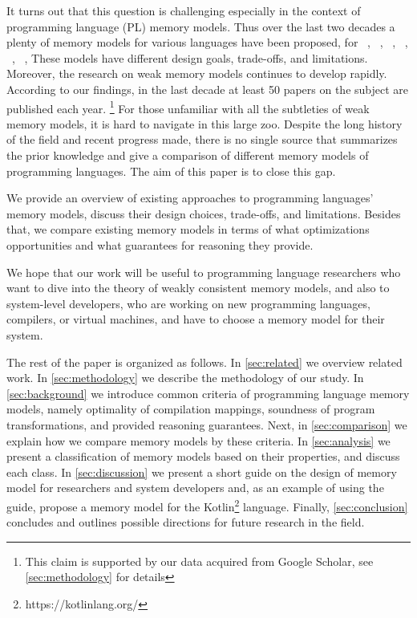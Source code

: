 It turns out that this question is challenging
especially in the context of programming language (PL) memory models.
Thus over the last two decades a plenty of memory models 
for various languages have been proposed, \eg
for \Java~\cite{Manson-al:POPL05, Bender-Palsberg:OOPSLA19}, \CPP~\cite{Batty-al:POPL11}, 
\LLVM~\cite{Chakraborty-Vafeiadis:CGO17}, \JS~\cite{Watt-al:PLDI2020}, 
\OCaml~\cite{Manson-al:POPL05}, \Haskell~\cite{Vollmer-al:PPoPP17}, \etc 
These models have different design goals, trade-offs, and limitations.
Moreover, the research on weak memory models continues to develop rapidly.
According to our findings, 
in the last decade at least 50 papers on the subject are published each year.%
\footnote{This claim is supported by our data acquired from Google Scholar, 
see \cref{sec:methodology} for details}  
For those unfamiliar with all the subtleties 
of weak memory models, it is hard to navigate in this large zoo.
Despite the long history of the field and recent progress made, 
there is no single source that summarizes the prior knowledge
and give a comparison of different memory models of programming languages. 
The aim of this paper is to close this gap.

We provide an overview of existing approaches to 
programming languages' memory models,
discuss their design choices, trade-offs, and limitations.
Besides that, we compare existing memory models 
in terms of what optimizations opportunities 
and what guarantees for reasoning they provide.

We hope that our work will be useful to programming language researchers 
who want to dive into the theory of weakly consistent memory models,
and also to system-level developers, 
who are working on new programming languages, compilers, or virtual machines, 
and have to choose a memory model for their system.

The rest of the paper is organized as follows.
In \cref{sec:related} we overview related work. 
In \cref{sec:methodology} we describe the methodology 
of our study. In \cref{sec:background} we 
introduce common criteria of programming language memory models,
namely optimality of compilation mappings, 
soundness of program transformations, 
and provided reasoning guarantees.
Next, in \cref{sec:comparison} we explain 
how we compare memory models by these criteria.
In \cref{sec:analysis} we present a classification
of memory models based on their properties, 
and discuss each class. 
In \cref{sec:discussion} we present a short guide 
on the design of memory model for researchers and system developers
and, as an example of using the guide, propose a memory model for 
the Kotlin\footnote{https://kotlinlang.org/} language.
Finally, \cref{sec:conclusion} concludes 
and outlines possible directions for future research in the field. 
